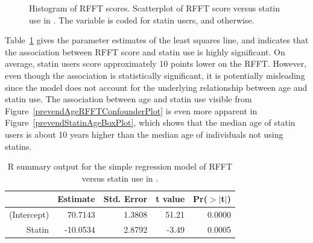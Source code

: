 \begin{figure}[ht]
	\centering
	\caption{ Histogram of RFFT scores.  Scatterplot of RFFT score versus statin use in . The variable  is coded  for statin users, and  otherwise.}
	\label{prevendStatinRFFTPlot}
\end{figure}

Table~\ref{prevendRFFTStatinRegression} gives the parameter estimates of the least squares line, and indicates that the association between RFFT score and statin use is highly significant. On average, statin users score approximately 10 points lower on the RFFT. However, even though the association is statistically significant, it is potentially misleading since the model does not account for the underlying relationship between age and statin use. The association between age and statin use visible from Figure~\ref{prevendAgeRFFTConfounderPlot} is even more apparent in Figure~\ref{prevendStatinAgeBoxPlot}, which shows that the median age of statin users is about 10 years higher than the median age of individuals not using statins. 

\begin{table}[ht]
\centering
\begin{tabular}{rrrrr}
  \hline
 & Estimate & Std. Error & t value & Pr($>$$|$t$|$) \\ 
  \hline
(Intercept) & 70.7143 & 1.3808 & 51.21 & 0.0000 \\ 
  Statin & -10.0534 & 2.8792 & -3.49 & 0.0005 \\ 
   \hline
\end{tabular}
\caption{\textsf{R} summary output for the simple regression model of RFFT versus statin use in .} 
\label{prevendRFFTStatinRegression}
\end{table}

